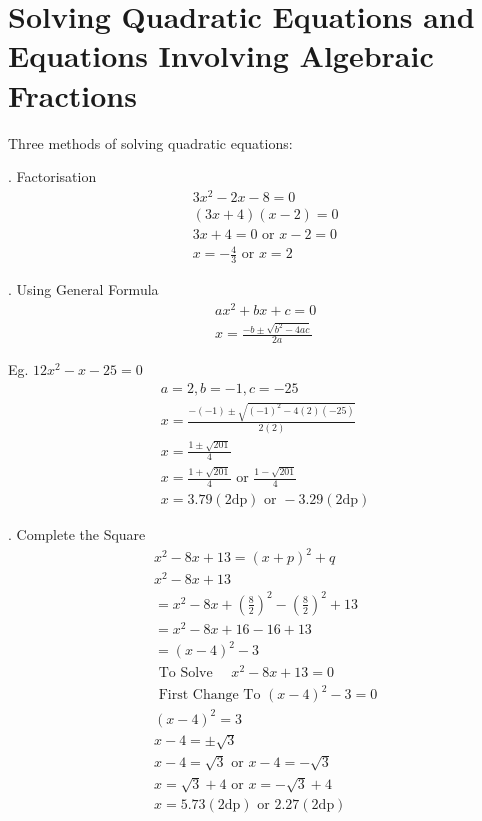 \documentclass[twocolumn]{article}
\begin{document}
\section*{Solving Quadratic Equations and Equations Involving Algebraic Fractions}

\noindent 
Three methods of solving quadratic equations:

\bigskip 

. Factorisation
$$
\begin{aligned}
	& 3 x^2-2 x-8=0 \\
	& (3 x+4)(x-2)=0 \\
	& 3 x+4=0 \text { or } x-2=0 \\
	& x=-\frac{4}{3} \text { or } x=2
\end{aligned}
$$

\bigskip

. Using General Formula
$$
\begin{aligned}
	& a x^2+b x+c=0 \\
	& x=\frac{-b \pm \sqrt{b^2-4 a c}}{2 a}
\end{aligned}
$$

Eg. $12 x^2-x-25=0$
$$
\begin{aligned}
	& a=2, b=-1, c=-25 \\
	& x=\frac{-(-1) \pm \sqrt{(-1)^2-4(2)(-25)}}{2(2)} \\
	& x=\frac{1 \pm \sqrt{201}}{4} \\
	& x=\frac{1+\sqrt{201}}{4} \text { or } \frac{1-\sqrt{201}}{4} \\
	& x=3.79(2 \mathrm{dp}) \text { or }-3.29(2 \mathrm{dp})
\end{aligned}
$$

\bigskip

. Complete the Square
$$
\begin{aligned}
	& x^2-8 x+13=(x+p)^2+q \\
	& x^2-8 x+13 \\
	&= x^2-8 x+\left(\frac{8}{2}\right)^2-\left(\frac{8}{2}\right)^2+13 \\
	&= x^2-8 x+16-16+13 \\
	&=(x-4)^2-3 \\
& \text { To Solve } \quad x^2-8 x+13=0 \\ & \text { First Change To }(x-4)^2-3=0 \\ & (x-4)^2=3 \\ & x-4= \pm \sqrt{3} \\ & x-4=\sqrt{3} \text { or } x-4=-\sqrt{3} \\ & x=\sqrt{3}+4 \text { or } x=-\sqrt{3}+4 \\ & x=5.73(2 \mathrm{dp}) \text { or } 2.27(2 \mathrm{dp}) \\ & \end{aligned}$$
\end{document}
